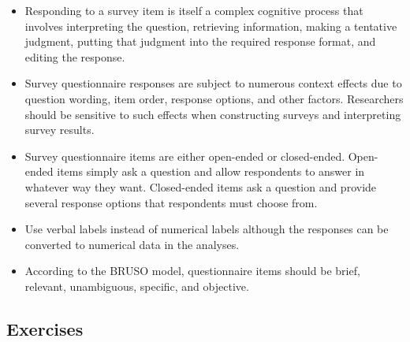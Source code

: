 \begin{fullwidth}

\begin{itemize}


\item Responding to a survey item is itself a complex cognitive process that involves interpreting the question, retrieving information, making a tentative judgment, putting that judgment into the required response format, and editing the response.

\item Survey questionnaire responses are subject to numerous context effects due to question wording, item order, response options, and other factors. Researchers should be sensitive to such effects when constructing surveys and interpreting survey results.

\item Survey questionnaire items are either open-ended or closed-ended. Open-ended items simply ask a question and allow respondents to answer in whatever way they want. Closed-ended items ask a question and provide several response options that respondents must choose from.

\item Use verbal labels instead of numerical labels although the responses can be converted to numerical data in the analyses.

\item According to the BRUSO model, questionnaire items should be brief, relevant, unambiguous, specific, and objective.


\end{itemize}

\end{fullwidth}



\subsection{Exercises}

